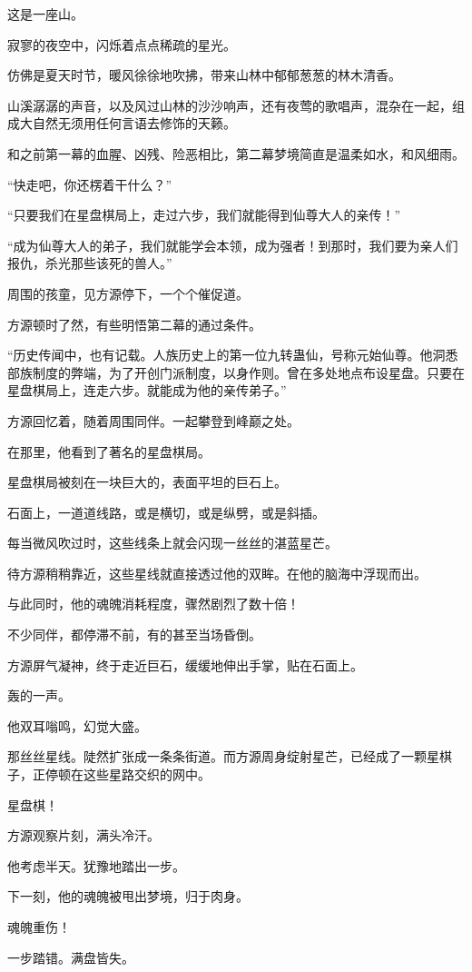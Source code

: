 \begin{this_body}
这是一座山。

寂寥的夜空中，闪烁着点点稀疏的星光。

仿佛是夏天时节，暖风徐徐地吹拂，带来山林中郁郁葱葱的林木清香。

山溪潺潺的声音，以及风过山林的沙沙响声，还有夜莺的歌唱声，混杂在一起，组成大自然无须用任何言语去修饰的天籁。

和之前第一幕的血腥、凶残、险恶相比，第二幕梦境简直是温柔如水，和风细雨。

“快走吧，你还楞着干什么？”

“只要我们在星盘棋局上，走过六步，我们就能得到仙尊大人的亲传！”

“成为仙尊大人的弟子，我们就能学会本领，成为强者！到那时，我们要为亲人们报仇，杀光那些该死的兽人。”

周围的孩童，见方源停下，一个个催促道。

方源顿时了然，有些明悟第二幕的通过条件。

“历史传闻中，也有记载。人族历史上的第一位九转蛊仙，号称元始仙尊。他洞悉部族制度的弊端，为了开创门派制度，以身作则。曾在多处地点布设星盘。只要在星盘棋局上，连走六步。就能成为他的亲传弟子。”

方源回忆着，随着周围同伴。一起攀登到峰巅之处。

在那里，他看到了著名的星盘棋局。

星盘棋局被刻在一块巨大的，表面平坦的巨石上。

石面上，一道道线路，或是横切，或是纵劈，或是斜插。

每当微风吹过时，这些线条上就会闪现一丝丝的湛蓝星芒。

待方源稍稍靠近，这些星线就直接透过他的双眸。在他的脑海中浮现而出。

与此同时，他的魂魄消耗程度，骤然剧烈了数十倍！

不少同伴，都停滞不前，有的甚至当场昏倒。

方源屏气凝神，终于走近巨石，缓缓地伸出手掌，贴在石面上。

轰的一声。

他双耳嗡鸣，幻觉大盛。

那丝丝星线。陡然扩张成一条条街道。而方源周身绽射星芒，已经成了一颗星棋子，正停顿在这些星路交织的网中。

星盘棋！

方源观察片刻，满头冷汗。

他考虑半天。犹豫地踏出一步。

下一刻，他的魂魄被甩出梦境，归于肉身。

魂魄重伤！

一步踏错。满盘皆失。


\end{this_body}
